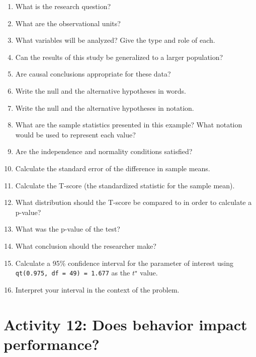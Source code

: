 \documentclass[
]{report}
\newcommand{\rgs}{\vspace{12pt}} %
\begin{document}
\begin{enumerate}
\def\labelenumi{\arabic{enumi}.}
\item
  What is the research question?
  \rgs
\item
  What are the observational units?
  \rgs
\item
  What variables will be analyzed? Give the type and role of each.
  \rgs
  \rgs
\item
  Can the results of this study be generalized to a larger population?
  \rgs
\item
  Are causal conclusions appropriate for these data?
  \rgs
\item
  Write the null and the alternative hypotheses in words.
  \rgs
  \rgs
\item
  Write the null and the alternative hypotheses in notation.
  \rgs
\item
  What are the sample statistics presented in this example? What notation would be used to represent each value?
  \rgs
\item
  Are the independence and normality conditions satisfied?
  \rgs
  \rgs
\item
  Calculate the standard error of the difference in sample means.
  \rgs
  \rgs
\item
  Calculate the T-score (the standardized statistic for the sample mean).
  \rgs
  \rgs
\item
  What distribution should the T-score be compared to in order to calculate a p-value?
  \rgs
\item
  What was the p-value of the test?
  \rgs
\item
  What conclusion should the researcher make?
  \rgs
  \rgs
\item
  Calculate a 95\% confidence interval for the parameter of interest using \texttt{qt(0.975,\ df\ =\ 49)\ =\ 1.677} as the \(t^\star\) value.
  \rgs
  \rgs
\item
  Interpret your interval in the context of the problem.
  \rgs
  \rgs
\end{enumerate}

\newpage

\hypertarget{activity-12-does-behavior-impact-performance}{%
\section{Activity 12: Does behavior impact performance?}\label{activity-12-does-behavior-impact-performance}}

\end{document}
